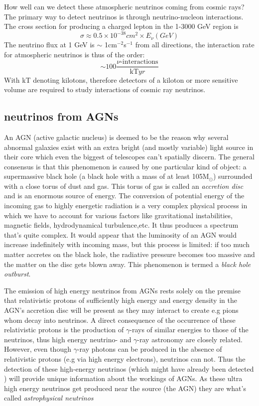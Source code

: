 How well can we detect these atmospheric neutrinos coming from cosmic rays?
The primary way to detect neutrinos is through neutrino-nucleon interactions.
The cross section for producing a charged lepton
\cite{gaisser_engel_resconi_2016} in the 1-3000 GeV region is
\begin{equation}
	\sigma \approx 0.5\times 10^{-38} cm^2\times E_\nu (GeV)
\end{equation}
The neutrino flux at 1 GeV is $\sim$ 1cm$^{-2}$s$^{-1}$ from all directions, the interaction rate for
atmospheric neutrinos is thus of the order:
\begin{equation}
	\sim 100\frac{\nu\text{-interactions}}{\text{kT} yr}
\end{equation}
With kT denoting kilotons, therefore detectors of a kiloton or more sensitive
volume are required to study interactions of cosmic ray
neutrinos\cite{GreisenAndReines}.

\subsection{neutrinos from AGNs}
An AGN (active galactic nucleus) is deemed to be the reason why several abnormal galaxies exist with
an extra bright (and mostly variable) light source in their core which even the biggest of telescopes
can't spatially discern. The general consensus is that this phenomenon is caused by one particular
kind of object: a supermassive black hole (a black hole with a mass of at least 105M$_\odot$) surrounded with
a close torus of dust and gas\cite{Shields_1999}.
This torus of gas is called an \textit{accretion disc} and is an enormous source of energy. The conversion
of potential energy of the incoming gas to highly energetic radiation is a very complex physical process
in which we have to account for various factors like gravitational instabilities, magnetic fields, hydrodynamical
turbulence,etc. It thus produces a spectrum that's quite complex.
It would appear that the luminosity of an AGN would increase indefinitely with incoming mass, but this process is 
limited: if too much matter accretes on the black hole, the radiative pressure becomes too massive and the 
matter on the disc gets blown away. This phenomenon is termed a \textit{black hole outburst}.

The emission of high energy neutrinos from AGNs rests solely on the premise
that relativistic protons of sufficiently high energy and energy density in the
AGN's accretion disc will be present \cite{NASANeutrinos} as they may interact
to create e.g pions whom decay into neutrinos. A direct consequence of the occurrence of these
relativistic protons is the production of $\gamma$-rays of similar energies to
those of the neutrinos, thus high energy neutrino- and $\gamma$-ray astronomy are
closely related.  However, even though $\gamma$-ray photons can be produced
in the absence of relativistic protons (e.g via high energy electrons),
neutrinos can not.  Thus the detection of these high-energy neutrinos (which
might have already been detected \cite{AGNNeutrino}) will provide unique
information about the workings of AGNs.
As these ultra high energy neutrinos get produced near the source (the AGN)
they are what's called \textit{astrophysical neutrinos}

